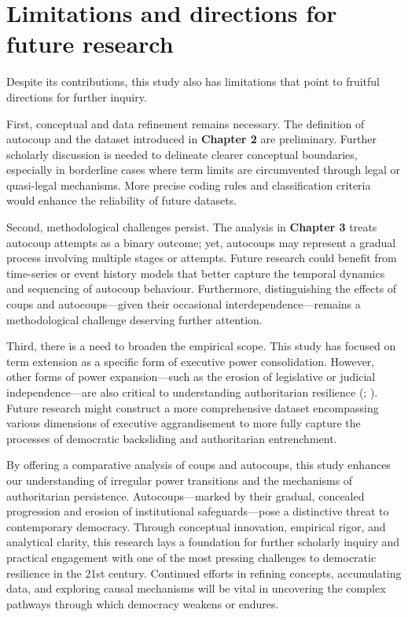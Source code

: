 \documentclass[
  12pt,
]{report}
\begin{document}
\section{Limitations and directions for future
research}\label{limitations-and-directions-for-future-research}

Despite its contributions, this study also has limitations that point to
fruitful directions for further inquiry.

First, conceptual and data refinement remains necessary. The definition
of autocoup and the dataset introduced in \textbf{Chapter 2} are
preliminary. Further scholarly discussion is needed to delineate clearer
conceptual boundaries, especially in borderline cases where term limits
are circumvented through legal or quasi-legal mechanisms. More precise
coding rules and classification criteria would enhance the reliability
of future datasets.

Second, methodological challenges persist. The analysis in
\textbf{Chapter 3} treats autocoup attempts as a binary outcome; yet,
autocoups may represent a gradual process involving multiple stages or
attempts. Future research could benefit from time-series or event
history models that better capture the temporal dynamics and sequencing
of autocoup behaviour. Furthermore, distinguishing the effects of coups
and autocoups---given their occasional interdependence---remains a
methodological challenge deserving further attention.

Third, there is a need to broaden the empirical scope. This study has
focused on term extension as a specific form of executive power
consolidation. However, other forms of power expansion---such as the
erosion of legislative or judicial independence---are also critical to
understanding authoritarian resilience
(;
). Future research
might construct a more comprehensive dataset encompassing various
dimensions of executive aggrandisement to more fully capture the
processes of democratic backsliding and authoritarian entrenchment.

By offering a comparative analysis of coups and autocoups, this study
enhances our understanding of irregular power transitions and the
mechanisms of authoritarian persistence. Autocoups---marked by their
gradual, concealed progression and erosion of institutional
safeguards---pose a distinctive threat to contemporary democracy.
Through conceptual innovation, empirical rigor, and analytical clarity,
this research lays a foundation for further scholarly inquiry and
practical engagement with one of the most pressing challenges to
democratic resilience in the 21st century. Continued efforts in refining
concepts, accumulating data, and exploring causal mechanisms will be
vital in uncovering the complex pathways through which democracy weakens
or endures.
\end{document}
